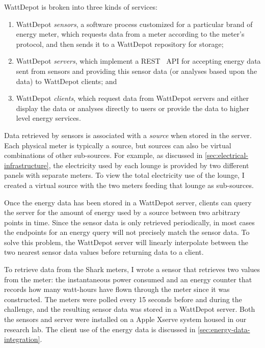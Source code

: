 WattDepot is broken into three kinds of services:

\begin{enumerate}
\item WattDepot \emph{sensors}, a software process customized for a particular brand of energy meter, which requests data from a meter according to the meter's protocol, and then sends it to a WattDepot repository for storage;

\item WattDepot \emph{servers}, which implement a REST~\cite{REST} API for accepting energy data sent from sensors and providing this sensor data (or analyses based upon the data) to WattDepot clients; and

\item WattDepot \emph{clients}, which request data from WattDepot servers and either display the data or analyses directly to users or provide the data to higher level energy services.
\end{enumerate}

Data retrieved by sensors is associated with a \emph{source} when stored in the server. Each physical meter is typically a source, but sources can also be virtual combinations of other sub-sources. For example, as discussed in \autoref{sec:electrical-infrastructure}, the electricity used by each lounge is provided by two different panels with separate meters. To view the total electricity use of the lounge, I created a virtual source with the two meters feeding that lounge as sub-sources.

Once the energy data has been stored in a WattDepot server, clients can query the server for the amount of energy used by a source between two arbitrary points in time. Since the sensor data is only retrieved periodically, in most cases the endpoints for an energy query will not precisely match the sensor data. To solve this problem, the WattDepot server will linearly interpolate between the two nearest sensor data values before returning data to a client.

To retrieve data from the Shark meters, I wrote a sensor that retrieves two values from the meter: the instantaneous power consumed and an energy counter that records how many watt-hours have flown through the meter since it was constructed. The meters were polled every 15 seconds before and during the challenge, and the resulting sensor data was stored in a WattDepot server. Both the sensors and server were installed on a Apple Xserve system housed in our research lab. The client use of the energy data is discussed in \autoref{sec:energy-data-integration}.


